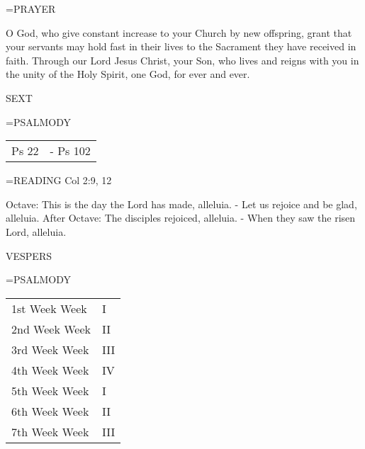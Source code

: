 \hangindent=\parindent \small PRAYER
\begin{description}[labelindent=\parindent, noitemsep, leftmargin=*]
\item [Octave:] 	O God, who give constant increase to your Church by new offspring, grant that your servants may hold fast in their lives to the Sacrament they have received in faith. Through our Lord Jesus Christ, your Son, who lives and reigns with you in the unity of the Holy Spirit, one God, for ever and ever.
\item [2nd Week:] 	
\item [3rd Week:] 	
\item [4th Week:] 	
\item [5th Week:] 	
\item [6th Week:] 	
\item [7th Week:] 	
\end{description}

\begin{flushleft}\normalsize SEXT\\\end{flushleft}
\hangindent=\parindent \small{PSALMODY}
\begin{center}
\begin{tabular}{ l l }
Ps 22 &  - Ps 102\\
\end{tabular}
\end{center}		

\hangindent=\parindent \small{READING}    Col 2:9, 12 \textbf{   }

Octave:	This is the day the Lord has made, alleluia.
		- Let us rejoice and be glad, alleluia.
After Octave:	The disciples rejoiced, alleluia.
		- When they saw the risen Lord, alleluia.

\begin{flushleft}\normalsize VESPERS\\\end{flushleft}
\hangindent=\parindent \small{PSALMODY}
\begin{center}
\begin{tabular}{ l l }
1st Week		Week &  I\\
2nd Week		Week &  II\\
3rd Week		Week &  III\\
4th Week		Week &  IV\\
5th Week		Week &  I\\
6th Week		Week &  II\\
7th Week		Week &  III\\
\end{tabular}
\end{center}		

